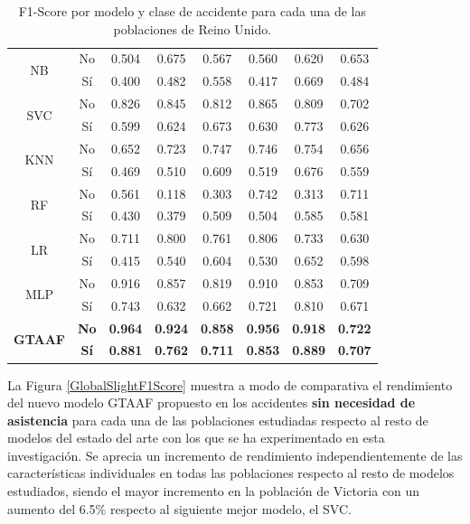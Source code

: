 \documentclass{uathesis-es}
\begin{document}
{\begin{table}[H]
\begin{center}
\begin{tabular}{|c|c||c|c|c|c|c|c|}
        \multirow{2}{*}{NB} &
            No & 0.504 & 0.675 &  0.567 & 0.560 & 0.620 & 0.653 \\ &
            Sí & 0.400 & 0.482 & 0.558 & 0.417 & 0.669 & 0.484 \\ \hline \hline
        \multirow{2}{*}{SVC} &
            No & 0.826 & 0.845 & 0.812 & 0.865 & 0.809 & 0.702 \\ &
            Sí & 0.599 & 0.624 & 0.673 & 0.630 & 0.773 & 0.626 \\ \hline \hline
        \multirow{2}{*}{KNN} &
            No  & 0.652 & 0.723 & 0.747 & 0.746 & 0.754 & 0.656 \\ &
            Sí & 0.469 & 0.510 & 0.609 & 0.519 & 0.676 & 0.559 \\ \hline \hline
        \multirow{2}{*}{RF} &
            No & 0.561  & 0.118 & 0.303 & 0.742 & 0.313 & 0.711 \\ &
            Sí & 0.430 & 0.379 & 0.509 & 0.504 & 0.585 & 0.581 \\ \hline \hline
        \multirow{2}{*}{LR} &
            No & 0.711 & 0.800 & 0.761 & 0.806 & 0.733 & 0.630 \\ &
            Sí & 0.415 & 0.540 & 0.604 & 0.530 & 0.652 & 0.598 \\ \hline \hline
        \multirow{2}{*}{MLP} &
            No & 0.916 &  0.857 & 0.819 & 0.910 & 0.853 & 0.709 \\ &
            Sí & 0.743 & 0.632 & 0.662 & 0.721 & 0.810 & 0.671 \\ \hline \hline
        \multirow{2}{*}{\textbf     {GTAAF}} &
            \textbf{No} & \textbf{0.964} & \textbf{0.924} & \textbf{0.858} & \textbf{0.956} & \textbf{0.918} & \textbf{0.722} \\ &
            \textbf{Sí} & \textbf{0.881} & \textbf{0.762} & \textbf{0.711} & \textbf{0.853} & \textbf{0.889} & \textbf{0.707} \\ \hline \hline
        \end{tabular}
    \end{center}
    \caption{F1-Score por modelo y clase de accidente para cada una de las poblaciones de Reino Unido.}
    \label{UKMetrics}
\end{table}


La Figura \ref{GlobalSlightF1Score} muestra a modo de comparativa el rendimiento del nuevo modelo GTAAF propuesto en los accidentes \textbf{sin necesidad de asistencia} para cada una de las poblaciones estudiadas respecto al resto de modelos del estado del arte con los que se ha experimentado en esta investigación. Se aprecia un incremento de rendimiento independientemente de las características individuales en todas las poblaciones respecto al resto de modelos estudiados, siendo el mayor incremento en la población de Victoria con un aumento del 6.5\% respecto al siguiente mejor modelo, el SVC.

}
\end{document}
